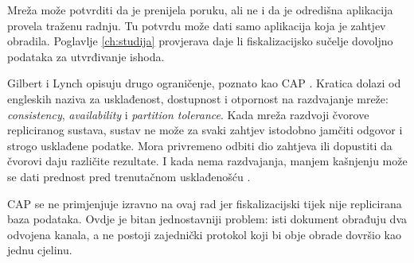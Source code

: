 Mreža može potvrditi da je prenijela poruku, ali ne i da je odredišna
aplikacija provela traženu radnju. Tu potvrdu može dati samo aplikacija koja
je zahtjev obradila. Poglavlje \ref{ch:studija} provjerava daje li
fiskalizacijsko sučelje dovoljno podataka za utvrđivanje ishoda.

Gilbert i Lynch opisuju drugo ograničenje, poznato kao CAP
\cite{gilbert2002brewer}. Kratica dolazi od engleskih naziva za usklađenost,
dostupnost i otpornost na razdvajanje mreže: \emph{consistency},
\emph{availability} i \emph{partition tolerance}. Kada mreža razdvoji
čvorove repliciranog sustava, sustav ne može za svaki zahtjev istodobno
jamčiti odgovor i strogo usklađene podatke. Mora privremeno odbiti dio
zahtjeva ili dopustiti da čvorovi daju različite rezultate. I kada nema
razdvajanja, manjem kašnjenju može se dati prednost pred trenutačnom
usklađenošću \cite{abadi2012consistency}.

CAP se ne primjenjuje izravno na ovaj rad jer fiskalizacijski tijek nije
replicirana baza podataka. Ovdje je bitan jednostavniji problem: isti dokument
obrađuju dva odvojena kanala, a ne postoji zajednički protokol koji bi obje
obrade dovršio kao jednu cjelinu.
